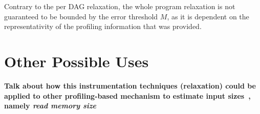 Contrary to the per DAG relaxation, the whole program relaxation is not guaranteed to be bounded by the error threshold $M$,
as it is dependent on the representativity of the profiling information that was provided.



\section{Other Possible Uses}

\textbf{Talk about how this instrumentation techniques (relaxation) could be applied to other profiling-based mechanism to estimate input sizes~\citep{zaparanuks12,coppa14}, namely \textit{read memory size}}
